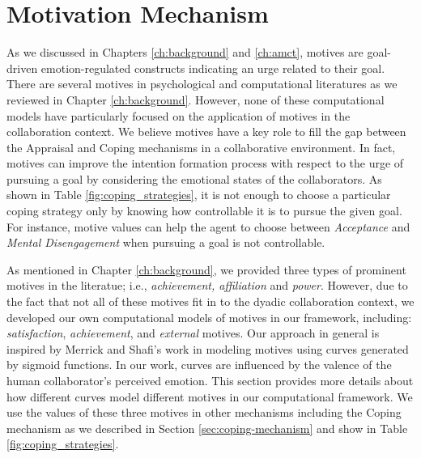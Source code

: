 \documentclass[12pt]{report}
\begin{document}
\section{Motivation Mechanism}
\label{sec:motivation_mechanism}
As we discussed in Chapters \ref{ch:background} and \ref{ch:amct}, motives are
goal-driven emotion-regulated constructs indicating an urge related to their
goal. There are several motives in psychological and computational literatures
as we reviewed in Chapter \ref{ch:background}. However, none of these
computational models have particularly focused on the application of motives in
the collaboration context. We believe motives have a key role to
fill the gap between the Appraisal and Coping mechanisms in a collaborative
environment. In fact, motives can improve the intention formation process with
respect to the urge of pursuing a goal by considering the emotional states of
the collaborators. As shown in Table \ref{fig:coping_strategies}, it is not
enough to choose a particular coping strategy only by knowing how controllable
it is to pursue the given goal. For instance, motive values can help the agent
to choose between \textit{Acceptance} and \textit{Mental Disengagement} when
pursuing a goal is not controllable.

As mentioned in Chapter \ref{ch:background}, we provided three types
of prominent motives in the literatue; i.e., \textit{achievement, affiliation} and
\textit{power}. However, due to the fact that not all of these motives fit in to
the dyadic collaboration context, we developed our own computational models of
motives in our framework, including: \textit{satisfaction},
\textit{achievement}, and \textit{external} motives. Our approach in general is
inspired by Merrick and Shafi's work in
\cite{merrick:acheievement-affiliation-power} modeling motives using curves
generated by sigmoid functions. In our work, curves are influenced by the
valence of the human collaborator's perceived emotion. This section provides
more details about how different curves model different motives in our computational
framework. We use the values of these three motives in other mechanisms
including the Coping mechanism as we described in Section
\ref{sec:coping-mechanism} and show in Table \ref{fig:coping_strategies}.
\end{document}
